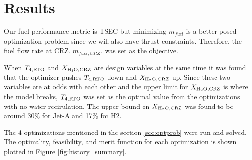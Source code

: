 \documentclass[conf]{new-aiaa}
\begin{document}
\section{Results}
\label{sec:results}
Our fuel performance metric is TSEC but minimizing $\dot{m}_{fuel}$ is a better posed optimization problem since we will also have thrust constraints.
Therefore, the fuel flow rate at CRZ, $\dot{m}_{fuel,CRZ}$, was set as the objective.

When $T_{4,\rm{RTO}}$ and $X_{\rm{H_2O,CRZ}}$ are design variables at the same time it was found that the optimizer pushes $T_{4,\rm{RTO}}$ down and $X_{\rm{H_2O,CRZ}}$ up.
Since these two variables are at odds with each other and the upper limit for $X_{\rm{H_2O,CRZ}}$ is where the model breaks, $T_{4,\rm{RTO}}$ was set as the optimal value from the optimizations with no water recirulation.
The upper bound on $X_{\rm{H_2O,CRZ}}$ was found to be around 30\% for Jet-A and 17\% for H2.

The 4 optimizations mentioned in the section \ref{sec:optprob} were run and solved.
The optimality, feasibility, and merit function for each optimization is shown plotted in Figure \ref{fig:history_summary}.
\end{document}
